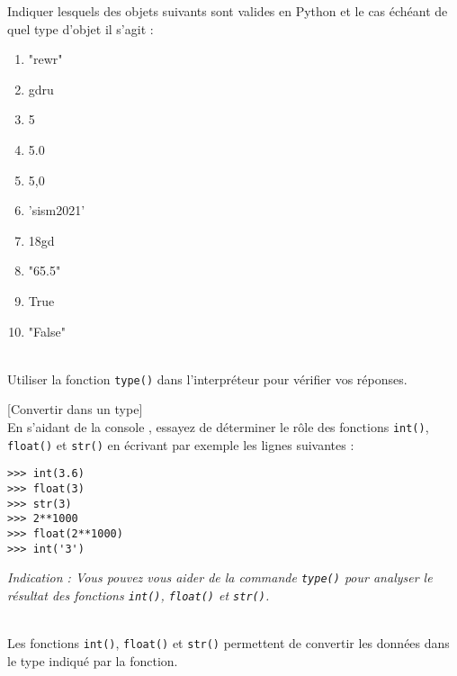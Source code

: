 \documentclass[a4paper,12pt]{article}
\begin{document}
Indiquer lesquels des objets suivants sont valides en Python et le cas échéant de quel type d'objet il s'agit :
\begin{multicols}{2}
	\begin{enumerate}[label=\alph*)]
		\item "rewr"
		\item gdru
		\item 5
		\item 5.0
		\item 5,0
		\item 'sism2021'
		\item 18gd
		\item "65.5"
		\item True
		\item "False"
	\end{enumerate}
\end{multicols}
	\begin{correction}
	~\\ 
	Utiliser la fonction \lstinline{type()} dans l'interpréteur \py pour vérifier vos réponses.
\end{correction}
\finexo

\newpage

\exo{}[Convertir dans un type]  ~\\ 
 En s'aidant de la console \py, essayez de déterminer le rôle des fonctions \lstinline{int()},
\lstinline{float()} et \lstinline{str()} en écrivant par exemple les lignes suivantes :
\begin{lstlisting}[numbers=none]
>>> int(3.6)
>>> float(3)
>>> str(3)
>>> 2**1000
>>> float(2**1000)
>>> int('3')
\end{lstlisting}
\vspace{0.3cm}
\textit{Indication : Vous pouvez vous aider de la commande \lstinline{type()} pour analyser le résultat des fonctions \lstinline{int()}, \lstinline{float()} et \lstinline{str()}.}
	\begin{correction}
	~\\ 
	Les fonctions \lstinline{int()}, \lstinline{float()} et \lstinline{str()} permettent de convertir les données dans le type indiqué par la fonction.
\end{correction}
\finexo
\end{document}
